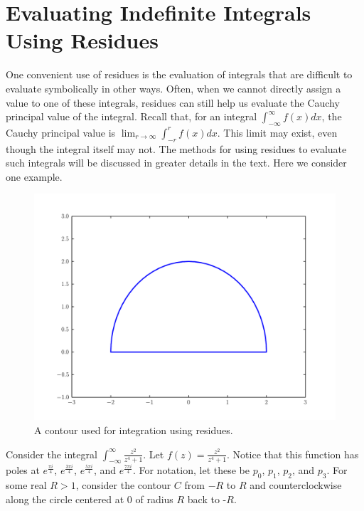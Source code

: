 \section*{Evaluating Indefinite Integrals Using Residues}

One convenient use of residues is the evaluation of integrals that are difficult to evaluate symbolically in other ways.
Often, when we cannot directly assign a value to one of these integrals, residues can still help us evaluate the Cauchy principal value of the integral.
Recall that, for an integral $\int_{-\infty}^{\infty} f(x)dx$, the Cauchy principal value is $\lim_{r\to \infty} \int_{-r}^{r} f(x) dx$.
This limit may exist, even though the integral itself may not.
The methods for using residues to evaluate such integrals will be discussed in greater details in the text.
Here we consider one example.

\begin{figure}
\includegraphics[width=\textwidth]{contour1.pdf}
\caption{A contour used for integration using residues.}
\label{complexint:c1}
\end{figure}

Consider the integral $\int_{-\infty}^{\infty}\frac{z^2}{z^4+1}$.
Let $f(z)=\frac{z^2}{z^4+1}$.
Notice that this function has poles at $e^{\frac{\pi i}{4}}$, $e^{\frac{3\pi i}{4}}$, $e^{\frac{5\pi i}{4}}$, and $e^{\frac{7\pi i}{4}}$.
For notation, let these be $p_0$, $p_1$, $p_2$, and $p_3$.
For some real $R>1$, consider the contour $C$ from $-R$ to $R$ and counterclockwise along the circle centered at $0$ of radius $R$ back to -$R$.

